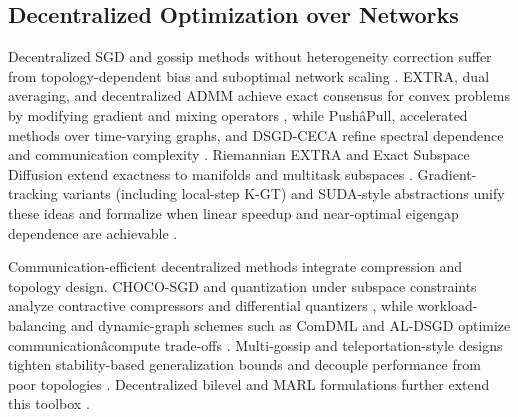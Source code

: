 \documentclass[11pt]{article}
\begin{document}
\subsection{Decentralized Optimization over Networks}

Decentralized SGD and gossip methods without heterogeneity correction suffer from topology-dependent bias and suboptimal network scaling \citep{lian2017can, Lian2017AsynchronousDP, Assran2018StochasticGP, blot2016gossip, Blot2018GoSGDDO, daily2018gossipgrad}. EXTRA, dual averaging, and decentralized ADMM achieve exact consensus for convex problems by modifying gradient and mixing operators \citep{shi2015extra, duchi2011dual, Shi2013OnTL}, while PushâPull, accelerated methods over time-varying graphs, and DSGD-CECA refine spectral dependence and communication complexity \citep{Pu2018PushPullGM, Rogozin2021AnAM, Ding2023DSGDCECADS, Rogozin2021AnAM, gupta2018shampoo}. Riemannian EXTRA and Exact Subspace Diffusion extend exactness to manifolds and multitask subspaces \citep{Wu2025RiemannianEC, Wadehra2023ExactSD}. Gradient-tracking variants (including local-step K-GT) and SUDA-style abstractions unify these ideas and formalize when linear speedup and near-optimal eigengap dependence are achievable \citep{Liu2023DecentralizedGT, Li2025UnveilingTP, Rogozin2021AnAM}.

Communication-efficient decentralized methods integrate compression and topology design. CHOCO-SGD and quantization under subspace constraints analyze contractive compressors and differential quantizers \citep{Koloskova2019DecentralizedSO, Nassif2022QuantizationFD}, while workload-balancing and dynamic-graph schemes such as ComDML and AL-DSGD optimize communicationâcompute trade-offs \citep{mohammadabadi2024communication, He2024AdjacentLD}. Multi-gossip and teleportation-style designs tighten stability-based generalization bounds and decouple performance from poor topologies \citep{chen2021accelerating, Ying2021ExponentialGI, Takezawa2025ScalableDL, Li2025UnveilingTP}. Decentralized bilevel and MARL formulations further extend this toolbox \citep{Wen2024ACA, Kong2024DecentralizedBO, zhao2021distributed, Zhou2025FedCanonNC}.
\end{document}
